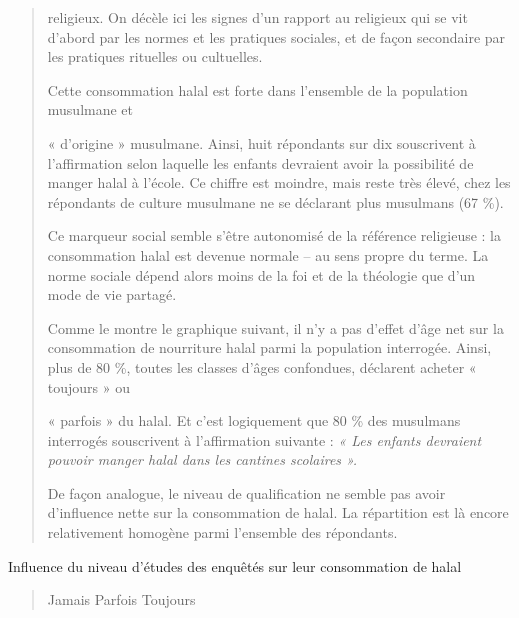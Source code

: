 \begin{quote}
religieux. On décèle ici les signes d'un rapport au religieux qui se vit
d'abord par les normes et les pratiques sociales, et de façon secondaire
par les pratiques rituelles ou cultuelles.

Cette consommation halal est forte dans l'ensemble de la population
musulmane et

« d'origine » musulmane. Ainsi, huit répondants sur dix souscrivent à
l'affirmation selon laquelle les enfants devraient avoir la possibilité
de manger halal à l'école. Ce chiffre est moindre, mais reste très
élevé, chez les répondants de culture musulmane ne se déclarant plus
musulmans (67 \%).

Ce marqueur social semble s'être autonomisé de la référence religieuse :
la consommation halal est devenue normale -- au sens propre du terme. La
norme sociale dépend alors moins de la foi et de la théologie que d'un
mode de vie partagé.

Comme le montre le graphique suivant, il n'y a pas d'effet d'âge net sur
la consommation de nourriture halal parmi la population interrogée.
Ainsi, plus de 80 \%, toutes les classes d'âges confondues, déclarent
acheter « toujours » ou

« parfois » du halal. Et c'est logiquement que 80 \% des musulmans
interrogés souscrivent à l'affirmation suivante : \emph{« Les enfants
devraient pouvoir manger halal dans les cantines scolaires ».}

De façon analogue, le niveau de qualification ne semble pas avoir
d'influence nette sur la consommation de halal. La répartition est là
encore relativement homogène parmi l'ensemble des répondants.
\end{quote}

Influence du niveau d'études des enquêtés sur leur consommation de halal

\begin{quote}
Jamais Parfois Toujours
\end{quote}

